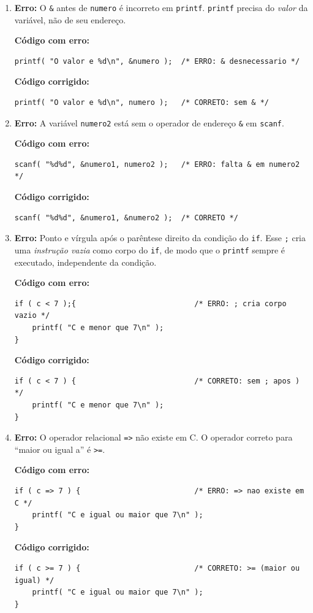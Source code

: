 \documentclass[12pt,a4paper]{article}
\begin{document}
\begin{respostabox}
\begin{enumerate}[label=\textbf{\alph*)}]

\item \textbf{Erro:} O \texttt{\&} antes de \texttt{numero} é incorreto em \texttt{printf}.
\texttt{printf} precisa do \textit{valor} da variável, não de seu endereço.

\textbf{Código com erro:}
\begin{lstlisting}
printf( "O valor e %d\n", &numero );  /* ERRO: & desnecessario */
\end{lstlisting}
\textbf{Código corrigido:}
\begin{lstlisting}
printf( "O valor e %d\n", numero );   /* CORRETO: sem & */
\end{lstlisting}

\item \textbf{Erro:} A variável \texttt{numero2} está sem o operador de endereço \texttt{\&}
em \texttt{scanf}.

\textbf{Código com erro:}
\begin{lstlisting}
scanf( "%d%d", &numero1, numero2 );   /* ERRO: falta & em numero2 */
\end{lstlisting}
\textbf{Código corrigido:}
\begin{lstlisting}
scanf( "%d%d", &numero1, &numero2 );  /* CORRETO */
\end{lstlisting}

\item \textbf{Erro:} Ponto e vírgula após o parêntese direito da condição do \texttt{if}.
Esse \texttt{;} cria uma \textit{instrução vazia} como corpo do \texttt{if}, de modo que
o \texttt{printf} sempre é executado, independente da condição.

\textbf{Código com erro:}
\begin{lstlisting}
if ( c < 7 );{                           /* ERRO: ; cria corpo vazio */
    printf( "C e menor que 7\n" );
}
\end{lstlisting}
\textbf{Código corrigido:}
\begin{lstlisting}
if ( c < 7 ) {                           /* CORRETO: sem ; apos ) */
    printf( "C e menor que 7\n" );
}
\end{lstlisting}

\item \textbf{Erro:} O operador relacional \texttt{=>} não existe em C. O operador correto
para ``maior ou igual a'' é \texttt{>=}.

\textbf{Código com erro:}
\begin{lstlisting}
if ( c => 7 ) {                          /* ERRO: => nao existe em C */
    printf( "C e igual ou maior que 7\n" );
}
\end{lstlisting}
\textbf{Código corrigido:}
\begin{lstlisting}
if ( c >= 7 ) {                          /* CORRETO: >= (maior ou igual) */
    printf( "C e igual ou maior que 7\n" );
}
\end{lstlisting}

\end{enumerate}
\end{respostabox}
\end{document}
